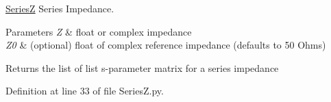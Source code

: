 \hyperlink{namespaceSignalIntegrity_1_1Devices_1_1SeriesZ}{SeriesZ} Series Impedance. 


\begin{DoxyParams}{Parameters}
{\em Z} & float or complex impedance \\
\hline
{\em Z0} & (optional) float of complex reference impedance (defaults to 50 Ohms) \\
\hline
\end{DoxyParams}
\begin{DoxyReturn}{Returns}
the list of list s-\/parameter matrix for a series impedance 
\end{DoxyReturn}


Definition at line 33 of file Series\+Z.\+py.

